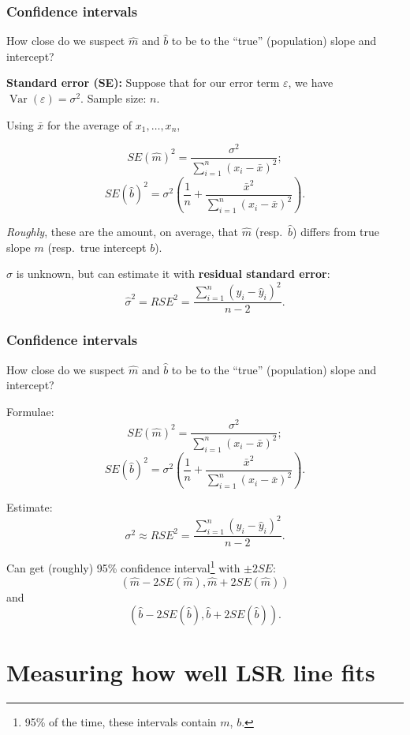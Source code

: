 \documentclass{beamer}
\theoremstyle{example}
\begin{document}
\begin{frame}
\frametitle{Confidence intervals}
How close do we suspect $\hat{m}$ and $\hat{b}$ to be to the ``true'' (population) slope and intercept?

\pause
\textbf{Standard error (SE):}  Suppose that for our error term $\varepsilon$, we have $\operatorname{Var}(\varepsilon) = \sigma^2$. Sample size: $n$.

\pause
Using $\bar{x}$ for the average of $x_1,\ldots,x_n$,

\[SE(\hat{m})^2 = \frac{\sigma^2}{\sum_{i=1}^n(x_i - \bar{x})^2};\]
\[SE(\hat{b})^2 = \sigma^2\left(\frac1{n} + \frac{\bar{x}^2}{\sum_{i=1}^n(x_i - \bar{x})^2}\right).\]

\pause
\emph{Roughly}, these are the amount, on average, that $\hat{m}$ (resp.\ $\hat{b}$) differs from true slope $m$ (resp.\ true intercept $b$).

\pause
$\sigma$ is unknown, but can estimate it with \textbf{residual standard error}:
    \[\hat{\sigma}^2 = RSE^2 = \frac{\sum_{i=1}^n(y_i - \hat{y}_i)^2}{n-2}.\]

\end{frame}


\begin{frame}
    \frametitle{Confidence intervals}
    How close do we suspect $\hat{m}$ and $\hat{b}$ to be to the ``true'' (population) slope and intercept?
    
    Formulae: 
    \[SE(\hat{m})^2 = \frac{\sigma^2}{\sum_{i=1}^n(x_i - \bar{x})^2};\]
    \[SE(\hat{b})^2 = \sigma^2\left(\frac1{n} + \frac{\bar{x}^2}{\sum_{i=1}^n(x_i - \bar{x})^2}\right).\]
    
    Estimate:
        \[\sigma^2 \approx RSE^2 = \frac{\sum_{i=1}^n(y_i - \hat{y}_i)^2}{n-2}.\]
    
        \pause
    Can get (roughly) 95\% confidence interval\footnote{95\% of the time, these intervals contain $m$, $b$.} with $\pm 2SE$: 
        \[(\hat{m} - 2SE(\hat{m}), \hat{m} + 2SE(\hat{m}))\]
    and 
        \[(\hat{b} - 2SE(\hat{b}), \hat{b} + 2SE(\hat{b})).\]
    
\end{frame}

\section{Measuring how well LSR line fits}
\end{document}
